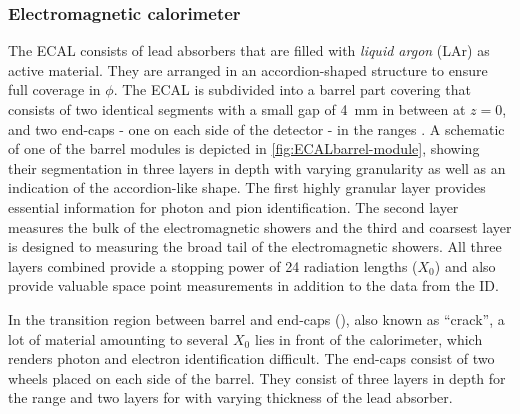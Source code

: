 
\subsubsection{Electromagnetic calorimeter}
The ECAL consists of lead absorbers that are filled with \emph{liquid argon} (LAr) as active material. 
They are arranged in an accordion-shaped structure to ensure full coverage in $\phi$.
The ECAL is subdivided into a barrel part covering  that consists of two identical segments with a small gap of \SI{4}{\milli\meter} in between at $z=0$, and two end-caps - one on each side of the detector - in the ranges .
A schematic of one of the barrel modules is depicted in \cref{fig:ECALbarrel-module}, showing their segmentation in three layers in depth with varying granularity as well as an indication of the accordion-like shape. The first highly granular layer provides essential information for photon and pion identification. The second layer measures the bulk of the electromagnetic showers and the third and coarsest layer is designed to measuring the broad tail of the electromagnetic showers. 
All three layers combined provide a stopping power of 24 radiation lengths ($X_0$) and also provide valuable space point measurements in addition to the data from the ID.

In the transition region between barrel and end-caps (), also known as ``crack'', a lot of material amounting to several $X_0$ lies in front of the calorimeter, which renders photon and electron identification difficult. 
The end-caps consist of two wheels placed on each side of the barrel. 
They consist of three layers in depth for the range  and two layers for  with varying thickness of the lead absorber. 

